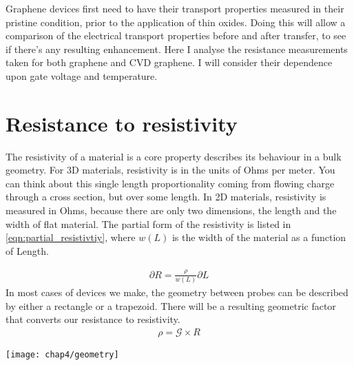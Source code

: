 \documentclass[../Matt_Gebert_Honours_Thesis.tex]{subfiles}
\begin{document}

Graphene devices first need to have their transport properties measured in their pristine condition, prior to the application of thin oxides. Doing this will allow a comparison of the electrical transport properties before and after transfer, to see if there's any resulting enhancement. Here I analyse the resistance measurements taken for both graphene and CVD graphene. I will consider their dependence upon gate voltage and temperature.

\section{Resistance to resistivity}
The resistivity of a material is a core property describes its behaviour in a bulk geometry. For 3D materials, resistivity is in the units of Ohms per meter. You can think about this single length proportionality coming from flowing charge through a cross section, but over some length. In 2D materials, resistivity is measured in Ohms, because there are only two dimensions, the length and the width of flat material. The partial form of the resistivity is listed in \cref{eqn:partial_resistivtiy}, where $w(L)$ is the width of the material as a function of Length.\\
\begin{minipage}{0.5\textwidth}
	\begin{align}
	\partial R = \frac{\rho}{w(L)}\partial L\label{eqn:partial_resistivtiy}
	\end{align}
	In most cases of devices we make, the geometry between probes can be described by either a rectangle or a trapezoid. There will be a resulting geometric factor that converts our resistance to resistivity.
	\begin{align}
	\rho = \mathcal{G} \times R
	\end{align}
\end{minipage}
\begin{minipage}{0.5\textwidth}
	\centering
	\texttt{[image: chap4/geometry]}
\end{minipage}\\
\end{document}
